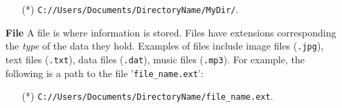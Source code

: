 \begin{itemize}
		\begin{itemize}
			\item[(*)]	\texttt{C://Users/Documents/DirectoryName/MyDir/}.
		\end{itemize}	
	\item[\textbf{File}]%
		A file is where information is stored. Files have extensions corresponding the \textit{type} of the data they hold. Examples of files include image files (\texttt{.jpg}), text files (\texttt{.txt}), data files (\texttt{.dat}), music files (\texttt{.mp3}). For example, the following is a path to the file '\texttt{file\_name.ext}':
		\begin{itemize}
			\item[(*)]	\texttt{C://Users/Documents/DirectoryName/file\_name.ext}.
		\end{itemize}
\end{itemize}


%